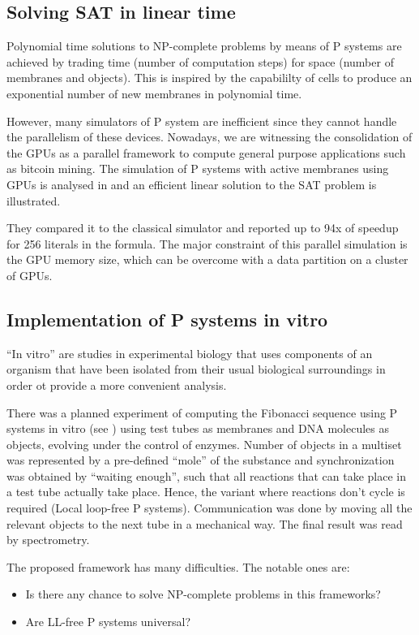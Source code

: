 
\subsection{Solving SAT in linear time} %
\label{sub:solving_sat_in_linear_time}


Polynomial time solutions to NP-complete problems by means of P systems are achieved by trading time (number of computation steps) for space (number of membranes and objects). This is inspired by the capabililty of cells to produce an exponential number of new membranes in polynomial time.

However, many simulators of P system are inefficient since they cannot handle the parallelism of these devices. Nowadays, we are witnessing the consolidation of the GPUs as a parallel framework to compute general purpose applications such as bitcoin mining. The simulation of P systems with active membranes using GPUs is analysed in \cite{Cecilia10SAT} and an efficient linear solution to the SAT problem is illustrated.

They compared it to the classical simulator and reported up to 94x of speedup for 256 literals in the formula. The major constraint of this parallel simulation is the GPU memory size, which can be overcome with a data partition on a cluster of GPUs. 


\subsection{Implementation of P systems in vitro} %
\label{sub:implementation_of_p_systems_in_vitro}

``In vitro'' are studies in experimental biology that uses components of an organism that have been isolated from their usual biological surroundings in order ot provide a more convenient analysis.

There was a planned experiment of computing the Fibonacci sequence using P systems in vitro (see \cite{Gershoni:2008:InVitro}) using test tubes as membranes and DNA molecules as objects, evolving under the control of enzymes.
Number of objects in a multiset was represented by a pre-defined ``mole'' of the substance and synchronization was obtained by ``waiting enough'', such that all reactions that can take place in a test tube actually take place. Hence, the variant where reactions don't cycle is required (Local loop-free P systems).
Communication was done by moving all the relevant objects to the next tube in a mechanical way. The final result was read by spectrometry.

The proposed framework has many difficulties. The notable ones are:

\begin{itemize}
  \item Is there any chance to solve NP-complete problems in this frameworks?
  \item Are LL-free P systems universal?
\end{itemize}


